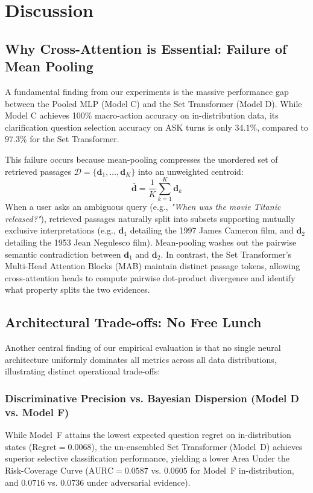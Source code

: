 \section{Discussion}
\label{sec:discussion}

\subsection{Why Cross-Attention is Essential: Failure of Mean Pooling}
A fundamental finding from our experiments is the massive performance gap between the Pooled MLP (Model C) and the Set Transformer (Model D). While Model C achieves 100\% macro-action accuracy on in-distribution data, its clarification question selection accuracy on ASK turns is only \textbf{$34.1\%$}, compared to \textbf{$97.3\%$} for the Set Transformer. 

This failure occurs because mean-pooling compresses the unordered set of retrieved passages $\mathcal{D} = \{\bm{d}_1, \dots, \bm{d}_K\}$ into an unweighted centroid:
\begin{equation*}
    \bar{\bm{d}} = \frac{1}{K} \sum_{k=1}^K \bm{d}_k
\end{equation*}
When a user asks an ambiguous query (e.g., \emph{"When was the movie Titanic released?"}), retrieved passages naturally split into subsets supporting mutually exclusive interpretations (e.g., $\bm{d}_1$ detailing the 1997 James Cameron film, and $\bm{d}_2$ detailing the 1953 Jean Negulesco film). Mean-pooling washes out the pairwise semantic contradiction between $\bm{d}_1$ and $\bm{d}_2$. In contrast, the Set Transformer's Multi-Head Attention Blocks (MAB) maintain distinct passage tokens, allowing cross-attention heads to compute pairwise dot-product divergence and identify what property splits the two evidences.

\subsection{Architectural Trade-offs: No Free Lunch}
Another central finding of our empirical evaluation is that no single neural architecture uniformly dominates all metrics across all data distributions, illustrating distinct operational trade-offs:

\subsubsection{Discriminative Precision vs. Bayesian Dispersion (Model D vs. Model F)}
While Model~F attains the lowest expected question regret on in-distribution states ($\text{Regret} = 0.0068$), the un-ensembled Set Transformer (Model~D) achieves superior selective classification performance, yielding a lower Area Under the Risk-Coverage Curve ($\text{AURC} = 0.0587$ vs. $0.0605$ for Model~F in-distribution, and $0.0716$ vs. $0.0736$ under adversarial evidence). 


